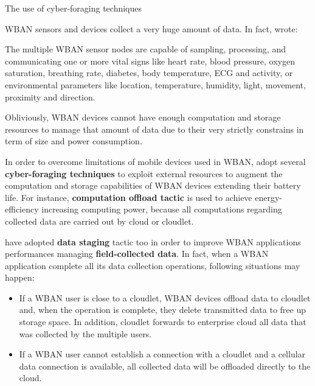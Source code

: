 \documentclass[10pt]{beamer}
\begin{document}
\begin{frame}{The use of cyber-foraging techniques} 

WBAN sensors and devices collect a very huge amount of data. In fact, \citet{MSAReport} wrote:

\vspace{0.3cm}

\begin{quoting}[font=itshape, begintext={``}, endtext={''\cite[par.~1.1]{MSAReport}}]
The multiple WBAN sensor nodes are capable of sampling, processing, and communicating one or more vital signs like heart rate, blood pressure, oxygen saturation, breathing rate, diabetes, body temperature, ECG and activity, or environmental parameters like location, temperature, humidity, light, movement, proximity and direction. 
\end{quoting}

\vspace{0.3cm}

Obliviously, WBAN devices cannot have enough computation and storage resources to manage that amount of data due to their very strictly constrains in term of size and power consumption. 

In order to overcome limitations of mobile devices used in WBAN, \citet{MSAReport} adopt several \textbf{cyber-foraging techniques} to exploit external resources to augment the computation and storage capabilities of WBAN devices extending their battery life. For instance, \textbf{computation offload tactic} is used to achieve energy-efficiency  increasing computing power, because all computations regarding collected data are carried out by cloud or cloudlet. 

\citet{MSAReport} have adopted \textbf{data staging} tactic too in order to improve WBAN applications performances managing \textbf{field-collected data}. In fact, when a WBAN application complete all its data collection operations, following situations may happen:

\begin{itemize}
\item If a WBAN user is close to a cloudlet, WBAN devices offload data to cloudlet and, when the operation is complete, they delete transmitted data to free up storage space. In addition, cloudlet forwards to enterprise cloud all data that was collected by the multiple users.

\item If a WBAN user cannot establish a connection with a cloudlet and a cellular data connection is available, all collected data will be offloaded directly to the cloud.
\end{itemize}


\end{frame}
\end{document}
